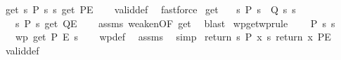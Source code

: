 \begin{isabellebody}
{\isafoldproof}%
%
\isadelimproof
\isanewline
%
\endisadelimproof
\isanewline
{}\isamarkupfalse%
\ get{\isacharcolon}{\kern0pt}\ {\isachardoublequoteopen}{\isasymlbrace}{\isasymlambda}s{\isachardot}{\kern0pt}\ P\ s\ s{\isasymrbrace}\ get\ {\isasymlbrace}P{\isasymrbrace}{\isacharcomma}{\kern0pt}{\isasymlbrace}E{\isasymrbrace}{\isachardoublequoteclose}\isanewline
%
\isadelimproof
\ \ %
\endisadelimproof
%
\isatagproof
{}\isamarkupfalse%
\ valid{\isacharunderscore}{\kern0pt}def\ \isamarkupfalse%
\ fastforce%
\endisatagproof
{\isafoldproof}%
%
\isadelimproof
\isanewline
%
\endisadelimproof
\isanewline
{}\isamarkupfalse%
\ get{\isacharprime}{\kern0pt}{\isacharcolon}{\kern0pt}\isanewline
\ \ \ {\isachardoublequoteopen}{\isasymforall}s{\isachardot}{\kern0pt}\ P\ s\ {\isasymlongrightarrow}\ Q\ s\ s{\isachardoublequoteclose}\isanewline
\ \ \ {\isachardoublequoteopen}{\isasymlbrace}{\isasymlambda}s{\isachardot}{\kern0pt}\ P\ s{\isasymrbrace}\ get\ {\isasymlbrace}Q{\isasymrbrace}{\isacharcomma}{\kern0pt}{\isasymlbrace}E{\isasymrbrace}{\isachardoublequoteclose}\isanewline
%
\isadelimproof
\ \ %
\endisadelimproof
%
\isatagproof
{}\isamarkupfalse%
\ assms\ weaken{\isacharbrackleft}{\kern0pt}OF\ get{\isacharbrackright}{\kern0pt}\ \isamarkupfalse%
\ blast%
\endisatagproof
{\isafoldproof}%
%
\isadelimproof
\isanewline
%
\endisadelimproof
\isanewline
{}\isamarkupfalse%
\ wpget{\isacharbrackleft}{\kern0pt}wprule{\isacharbrackright}{\kern0pt}{\isacharcolon}{\kern0pt}\ \isanewline
\ \ \ {\isachardoublequoteopen}P\ s\ s{\isachardoublequoteclose}\isanewline
\ \ \ {\isachardoublequoteopen}wp\ get\ P\ E\ s{\isachardoublequoteclose}\isanewline
%
\isadelimproof
\ \ %
\endisadelimproof
%
\isatagproof
{}\isamarkupfalse%
\ wp{\isacharunderscore}{\kern0pt}def\ \isamarkupfalse%
\ assms\ \isamarkupfalse%
\ simp%
\endisatagproof
{\isafoldproof}%
%
\isadelimproof
\isanewline
%
\endisadelimproof
\isanewline
{}\isamarkupfalse%
\ return{\isacharcolon}{\kern0pt}\ {\isachardoublequoteopen}{\isasymlbrace}{\isasymlambda}s{\isachardot}{\kern0pt}\ P\ x\ s{\isasymrbrace}\ return\ x\ {\isasymlbrace}P{\isasymrbrace}{\isacharcomma}{\kern0pt}{\isasymlbrace}E{\isasymrbrace}{\isachardoublequoteclose}\isanewline
%
\isadelimproof
\ \ %
\endisadelimproof
%
\isatagproof
{}\isamarkupfalse%
\ valid{\isacharunderscore}{\kern0pt}def\ \isamarkupfalse%

\end{isabellebody}
